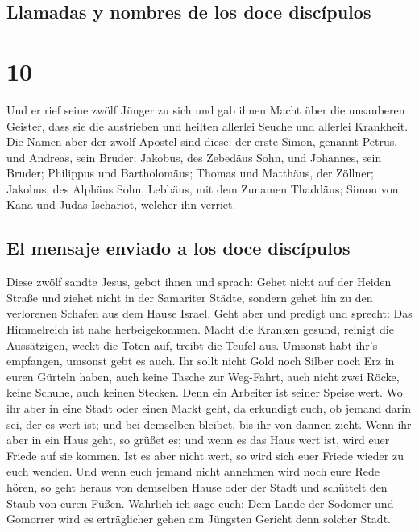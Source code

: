 \hypertarget{llamadas-y-nombres-de-los-doce-discuxedpulos}{%
\subsection{Llamadas y nombres de los doce
discípulos}\label{llamadas-y-nombres-de-los-doce-discuxedpulos}}

\hypertarget{section-9}{%
\section{10}\label{section-9}}

 Und er rief seine zwölf Jünger zu sich und gab ihnen
Macht über die unsauberen Geister, dass sie die austrieben und heilten
allerlei Seuche und allerlei Krankheit.  Die Namen aber
der zwölf Apostel sind diese: der erste Simon, genannt Petrus, und
Andreas, sein Bruder; Jakobus, des Zebedäus Sohn, und Johannes, sein
Bruder;  Philippus und Bartholomäus; Thomas und Matthäus,
der Zöllner; Jakobus, des Alphäus Sohn, Lebbäus, mit dem Zunamen
Thaddäus;  Simon von Kana und Judas Ischariot, welcher ihn
verriet.

\hypertarget{el-mensaje-enviado-a-los-doce-discuxedpulos}{%
\subsection{El mensaje enviado a los doce
discípulos}\label{el-mensaje-enviado-a-los-doce-discuxedpulos}}

 Diese zwölf sandte Jesus, gebot ihnen und sprach: Gehet
nicht auf der Heiden Straße und ziehet nicht in der Samariter Städte,
 sondern gehet hin zu den verlorenen Schafen aus dem Hause
Israel.  Geht aber und predigt und sprecht: Das
Himmelreich ist nahe herbeigekommen.  Macht die Kranken
gesund, reinigt die Aussätzigen, weckt die Toten auf, treibt die Teufel
aus. Umsonst habt ihr's empfangen, umsonst gebt es auch. 
Ihr sollt nicht Gold noch Silber noch Erz in euren Gürteln haben,
 auch keine Tasche zur Weg-Fahrt, auch nicht zwei Röcke,
keine Schuhe, auch keinen Stecken. Denn ein Arbeiter ist seiner Speise
wert.  Wo ihr aber in eine Stadt oder einen Markt geht,
da erkundigt euch, ob jemand darin sei, der es wert ist; und bei
demselben bleibet, bis ihr von dannen zieht.  Wenn ihr
aber in ein Haus geht, so grüßet es;  und wenn es das
Haus wert ist, wird euer Friede auf sie kommen. Ist es aber nicht wert,
so wird sich euer Friede wieder zu euch wenden.  Und wenn
euch jemand nicht annehmen wird noch eure Rede hören, so geht heraus von
demselben Hause oder der Stadt und schüttelt den Staub von euren Füßen.
 Wahrlich ich sage euch: Dem Lande der Sodomer und
Gomorrer wird es erträglicher gehen am Jüngsten Gericht denn solcher
Stadt.

